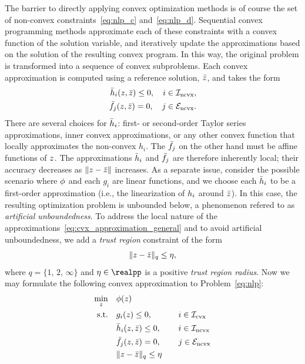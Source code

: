 \documentclass[letterpaper, 10 pt, conference]{ieeeconf}
\begin{document}
The barrier to directly applying convex optimization methods is of course the set of non-convex constraints~\eqref{eq:nlp_c} and~\eqref{eq:nlp_d}. Sequential convex programming methods approximate each of these constraints with a convex function of the solution variable, and iteratively update the approximations based on the solution of the resulting convex program. In this way, the original problem is transformed into a sequence of convex subproblems. Each convex approximation is computed using a reference solution, $\bar{z}$, and takes the form
\begin{subequations}\label{eq:cvx_approximation_general}
\begin{align}
\bar{h}_i(z,\bar{z}) \leq 0, \quad i\in\mathcal{I}_{\text{ncvx}}, \label{eq:cvx_approximation_general_ineq} \\
\bar{f}_j(z,\bar{z}) = 0, \quad j\in\mathcal{E}_{\text{ncvx}}. \label{eq:cvx_approximation_general_eq}
\end{align}
\end{subequations}
There are several choices for $\bar{h}_i$: first- or second-order Taylor series approximations, inner convex approximations, or any other convex function that locally approximates the non-convex $h_i$. The $\bar{f}_j$ on the other hand must be affine functions of $z$. The approximations $\bar{h}_i$ and $\bar{f}_j$ are therefore inherently local; their accuracy decreases as $\|z-\bar{z}\|$ increases. As a separate issue, consider the possible scenario where $\phi$ and each $g_i$ are linear functions, and we choose each $\bar{h}_i$ to be a first-order approximation (i.e., the linearization of $h_i$ around $\bar{z}$). In this case, the resulting optimization problem is unbounded below, a phenomenon refered to as \textit{artificial unboundedness}. To address the local nature of the approximations~\eqref{eq:cvx_approximation_general} and to avoid artificial unboundedness, we add a \textit{trust region} constraint of the form
\begin{equation}
\| z - \bar{z} \|_q \leq \eta,
\label{eq:trust_region}
\end{equation}
where $q=\{1,\,2,\,\infty\}$ and $\tr\in\realpp$ is a positive \textit{trust region radius}. Now we may formulate the following convex approximation to Problem~\eqref{eq:nlp}:
\begin{subequations}\label{eq:cvx_tr}
\begin{align}
\min_z &\quad \ocost(\z) &&\null \label{eq:cvx_tr_a} \\
\text{s.t.} &\quad \fc_i(\z) \leq 0, &&\quad i\in\setIcvx \label{eq:cvx_tr_b} \\
&\quad \fnib_i(\z,\zb) \leq 0, &&\quad i\in\setIncvx \label{eq:cvx_tr_c}\\
&\quad \fneb_j(\z,\zb) = 0, &&\quad j\in\setEncvx \label{eq:cvx_tr_d} \\
&\quad \| \z - \zb \|_q \leq \tr  &&\null \label{eq:cvx_tr_e}
\end{align}
\end{subequations}
\end{document}
